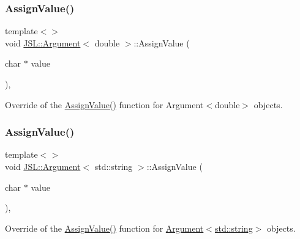 \mbox{\label{classJSL_1_1Argument_afbd6b9b5c50de60cee39f4b0ab327375}} 
\subsubsection{\texorpdfstring{Assign\+Value()}{AssignValue()}\hspace{0.1cm}{\footnotesize\ttfamily [4/6]}}
{\footnotesize\ttfamily template$<$$>$ \\
void \hyperlink{classJSL_1_1Argument}{J\+S\+L\+::\+Argument}$<$ double $>$\+::Assign\+Value (\begin{DoxyParamCaption}\item[{char $\ast$}]{value }\end{DoxyParamCaption})\hspace{0.3cm}{\ttfamily [inline]}, {\ttfamily [private]}}



Override of the \hyperlink{classJSL_1_1Argument_abc43696d406a6d369cd1b3d8cb1540b5}{Assign\+Value()} function for Argument$<$double$>$ objects. 

\mbox{\label{classJSL_1_1Argument_a1b443f8b8948e7aaec2154ed15e6f08f}} 
\subsubsection{\texorpdfstring{Assign\+Value()}{AssignValue()}\hspace{0.1cm}{\footnotesize\ttfamily [5/6]}}
{\footnotesize\ttfamily template$<$$>$ \\
void \hyperlink{classJSL_1_1Argument}{J\+S\+L\+::\+Argument}$<$ std\+::string $>$\+::Assign\+Value (\begin{DoxyParamCaption}\item[{char $\ast$}]{value }\end{DoxyParamCaption})\hspace{0.3cm}{\ttfamily [inline]}, {\ttfamily [private]}}



Override of the \hyperlink{classJSL_1_1Argument_abc43696d406a6d369cd1b3d8cb1540b5}{Assign\+Value()} function for \hyperlink{classJSL_1_1Argument_ab438509a3c030516de72f3f493295bd5}{Argument$<$std\+::string$>$} objects. 

